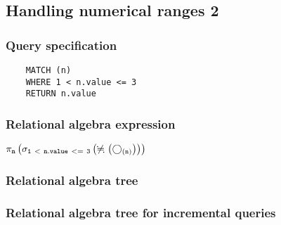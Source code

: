	\subsection{Handling numerical ranges 2}

	\subsubsection*{Query specification}

	\begin{lstlisting}
	MATCH (n)
	WHERE 1 < n.value <= 3
	RETURN n.value
	\end{lstlisting}


	\subsubsection*{Relational algebra expression}

	$\projection{\var{n}} \left(\selection{\mathtt{1~<~n.value~<=~3}} \left(\alldifferent{} \left(\getvertices{n}{}\right)\right)\right)$

	\subsubsection*{Relational algebra tree}


	\subsubsection*{Relational algebra tree for incremental queries}

